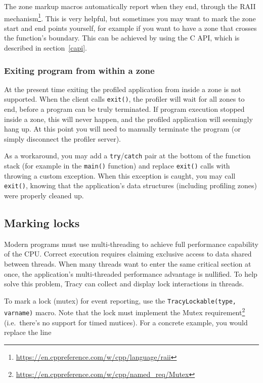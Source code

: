 \documentclass[hidelinks,titlepage,a4paper]{article}
\begin{document}
The zone markup macros automatically report when they end, through the RAII mechanism\footnote{\url{https://en.cppreference.com/w/cpp/language/raii}}. This is very helpful, but sometimes you may want to mark the zone start and end points yourself, for example if you want to have a zone that crosses the function's boundary. This can be achieved by using the C API, which is described in section~\ref{capi}.

\subsubsection{Exiting program from within a zone}

At the present time exiting the profiled application from inside a zone is not supported. When the client calls \texttt{exit()}, the profiler will wait for all zones to end, before a program can be truly terminated. If program execution stopped inside a zone, this will never happen, and the profiled application will seemingly hang up. At this point you will need to manually terminate the program (or simply disconnect the profiler server).

As a workaround, you may add a \texttt{try}/\texttt{catch} pair at the bottom of the function stack (for example in the \texttt{main()} function) and replace \texttt{exit()} calls with throwing a custom exception. When this exception is caught, you may call \texttt{exit()}, knowing that the application's data structures (including profiling zones) were properly cleaned up.

\subsection{Marking locks}

Modern programs must use multi-threading to achieve full performance capability of the CPU. Correct execution requires claiming exclusive access to data shared between threads. When many threads want to enter the same critical section at once, the application's multi-threaded performance advantage is nullified. To help solve this problem, Tracy can collect and display lock interactions in threads.

To mark a lock (mutex) for event reporting, use the \texttt{TracyLockable(type, varname)} macro. Note that the lock must implement the Mutex requirement\footnote{\url{https://en.cppreference.com/w/cpp/named_req/Mutex}} (i.e.\ there's no support for timed mutices). For a concrete example, you would replace the line
\end{document}
